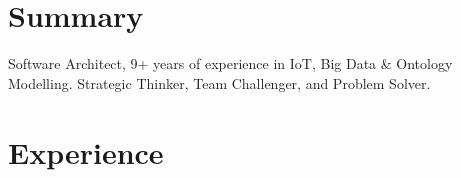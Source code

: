 \documentclass[letterpaper]{twentysecondcv} %
\begin{document}
\makeprofile %





\section{Summary}
Software Architect, 9+ years of experience in IoT, Big Data \& Ontology Modelling.
Strategic Thinker, Team Challenger, and Problem Solver.

\section{Experience}
\end{document}
